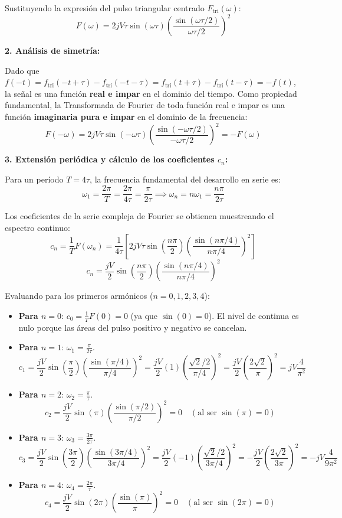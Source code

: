 \begin{problema}
Sustituyendo la expresión del pulso triangular centrado $F_{\text{tri}}(\omega)$:
\[ F(\omega) = 2j V \tau \sin(\omega \tau) \left( \frac{\sin(\omega \tau / 2)}{\omega \tau / 2} \right)^2 \]

\textbf{2. Análisis de simetría:}

Dado que $f(-t) = f_{\text{tri}}(-t + \tau) - f_{\text{tri}}(-t - \tau) = f_{\text{tri}}(t + \tau) - f_{\text{tri}}(t - \tau) = -f(t)$, la señal es una función \textbf{real e impar} en el dominio del tiempo.
Como propiedad fundamental, la Transformada de Fourier de toda función real e impar es una función \textbf{imaginaria pura e impar} en el dominio de la frecuencia:
\[ F(-\omega) = 2j V \tau \sin(-\omega \tau) \left( \frac{\sin(-\omega \tau / 2)}{-\omega \tau / 2} \right)^2 = -F(\omega) \]

\textbf{3. Extensión periódica y cálculo de los coeficientes $c_n$:}

Para un período $T = 4\tau$, la frecuencia fundamental del desarrollo en serie es:
\[ \omega_1 = \frac{2\pi}{T} = \frac{2\pi}{4\tau} = \frac{\pi}{2\tau} \implies \omega_n = n \omega_1 = \frac{n\pi}{2\tau} \]

Los coeficientes de la serie compleja de Fourier se obtienen muestreando el espectro continuo:
\[ c_n = \frac{1}{T} F(\omega_n) = \frac{1}{4\tau} \left[ 2j V \tau \sin\left(\frac{n\pi}{2}\right) \left( \frac{\sin(n\pi / 4)}{n\pi / 4} \right)^2 \right] \]
\[ c_n = \frac{j V}{2} \sin\left(\frac{n\pi}{2}\right) \left( \frac{\sin(n\pi / 4)}{n\pi / 4} \right)^2 \]

Evaluando para los primeros armónicos ($n = 0, 1, 2, 3, 4$):
\begin{itemize}
    \item \textbf{Para $n = 0$}: $c_0 = \frac{1}{T} F(0) = 0$ (ya que $\sin(0) = 0$). El nivel de continua es nulo porque las áreas del pulso positivo y negativo se cancelan.
    \item \textbf{Para $n = 1$}: $\omega_1 = \frac{\pi}{2\tau}$.
    \[ c_1 = \frac{j V}{2} \sin\left(\frac{\pi}{2}\right) \left( \frac{\sin(\pi / 4)}{\pi / 4} \right)^2 = \frac{j V}{2} (1) \left( \frac{\sqrt{2}/2}{\pi / 4} \right)^2 = \frac{j V}{2} \left( \frac{2\sqrt{2}}{\pi} \right)^2 = j V \frac{4}{\pi^2} \]
    \item \textbf{Para $n = 2$}: $\omega_2 = \frac{\pi}{\tau}$.
    \[ c_2 = \frac{j V}{2} \sin(\pi) \left( \frac{\sin(\pi / 2)}{\pi / 2} \right)^2 = 0 \quad (\text{al ser } \sin(\pi) = 0) \]
    \item \textbf{Para $n = 3$}: $\omega_3 = \frac{3\pi}{2\tau}$.
    \[ c_3 = \frac{j V}{2} \sin\left(\frac{3\pi}{2}\right) \left( \frac{\sin(3\pi / 4)}{3\pi / 4} \right)^2 = \frac{j V}{2} (-1) \left( \frac{\sqrt{2}/2}{3\pi / 4} \right)^2 = -\frac{j V}{2} \left( \frac{2\sqrt{2}}{3\pi} \right)^2 = -j V \frac{4}{9\pi^2} \]
    \item \textbf{Para $n = 4$}: $\omega_4 = \frac{2\pi}{\tau}$.
    \[ c_4 = \frac{j V}{2} \sin(2\pi) \left( \frac{\sin(\pi)}{\pi} \right)^2 = 0 \quad (\text{al ser } \sin(2\pi) = 0) \]
\end{itemize}


\end{problema}
